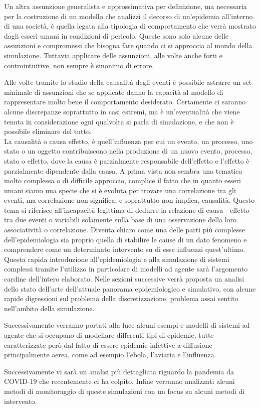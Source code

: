 Un altra assunzione generalista e approssimativa per definizione, ma necessaria per la costruzione 
di un modello che analizzi il decorso di un’epidemia all’interno di una società, 
è quella legata alla tipologia di comportamento che verrà mostrato 
dagli esseri umani in condizioni di pericolo. 
Queste sono solo alcune delle assunzioni e compromessi che bisogna fare quando ci si approccia 
al mondo della simulazione. Tuttavia applicare delle assunzioni, 
alle volte anche forti e controintuitive, non sempre è sinonimo di errore. 

Alle volte tramite lo studio della causalità degli eventi è possibile astrarre un set minimale 
di assunzioni che se applicate danno la capacità al modello di rappresentare molto 
bene il comportamento desiderato. 
Certamente ci saranno alcune discrepanze soprattutto in casi estremi, 
ma è un’eventualità che viene tenuta in considerazione ogni qualvolta si parla di simulazione, 
e che non è possibile eliminare del tutto. 
\\

La causalità o causa effetto, è quell’influenza per cui un evento, un processo, 
uno stato o un oggetto contribuiscono nella produzione di un nuovo evento, processo, 
stato o effetto, dove la causa è parzialmente responsabile dell’effetto e l’effetto 
è parzialmente dipendente dalla causa. 
A prima vista non sembra una tematica molto complessa o di difficile approccio, 
complice il fatto che in quanto esseri umani siamo una specie che si è evoluta per trovare una 
correlazione tra gli eventi, ma correlazione non significa, e soprattutto non implica, causalità. 
Questo tema si riferisce all’incapacità legittima di dedurre la relazione di causa - effetto tra due eventi 
o variabili solamente sulla base di una osservazione della loro associatività o correlazione. 
Diventa chiaro come una delle parti più complesse dell’epidemiologia sia 
proprio quella di stabilire le cause di un dato fenomeno e comprendere come 
un determinato intervento su di esse influenzi quest’ultimo. 
\\

Questa rapida introduzione all’epidemiologia e alla simulazione di sistemi complessi 
tramite l’utilizzo in particolare di modelli ad agente sarà l’argomento cardine dell’intero elaborato. 
Nelle sezioni successive verrà proposta un analisi dello stato dell’arte dell’attuale 
panorama epidemiologico e simulativo, con alcune rapide digressioni sul problema della discretizzazione, 
problema assai sentito nell’ambito della simulazione. 

Successivamente verranno portati alla luce alcuni esempi e modelli di sistemi ad agente 
che si occupano di modellare differenti tipi di epidemie, 
tutte caratterizzate però dal fatto di essere epidemie infettive a diffusione principalmente aerea, 
come ad esempio l’ebola, l’aviaria e l’influenza. 

Successivamente vi sarà un analisi più dettagliata riguardo la pandemia da COVID-19 
che recentemente ci ha colpito. Infine verranno analizzati alcuni metodi di monitoraggio 
di queste simulazioni con un focus su alcuni metodi di intervento.